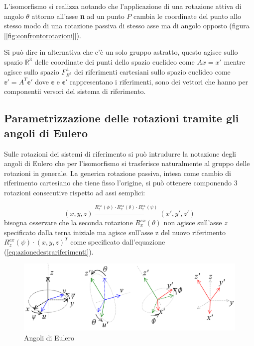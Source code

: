 \documentclass[11pt]{report}
\theoremstyle{plain}
\theoremstyle{definition}
\theoremstyle{remark}
\begin{document}
L'isomorfismo si realizza notando che l'applicazione di una rotazione attiva di angolo $\theta$ attorno all'asse \textbf{n} ad un punto $P$ cambia le coordinate del punto allo stesso modo di una rotazione passiva di stesso asse ma di angolo opposto (figura [\ref{fig:confrontorotazioni}]).

Si può dire in alternativa che c'è un solo gruppo astratto, questo agisce sullo spazio $\mathbb{R}^{3}$ delle coordinate dei punti dello spazio euclideo come $A x = x'$ mentre agisce sullo spazio $F_{E^{3}}^{\bot}$ dei riferimenti cartesiani sullo spazio euclideo come $ \mathbb{e'} = A^{T}\mathbb{e'} $ dove $\mathbb{e}$ e $\mathbb{e}'$ rappresentano i riferimenti, sono dei vettori che hanno per componentii versori del sistema di riferimento.

\subsection{Parametrizzazione delle rotazioni tramite gli angoli di Eulero}
Sulle rotazioni dei sistemi di riferimento si può intrudurre la notazione degli angoli di Eulero che per l'isomorfismo si trasferisce naturalmente al gruppo delle rotazioni in generale.
La generica rotazione passiva, intesa come cambio di riferimento cartesiano che tiene fisso l'origine, si può ottenere componendo 3 rotazioni consecutive rispetto ad assi semplici:

\begin{equation}
(x,y,z)\xrightarrow{R^{ex}_{z}(\phi) \cdot R^{ex}_{x}(\theta)\cdot R^{ex}_{z}(\psi)} (x',y',z')
\end{equation}
bisogna osservare che la seconda rotazione $R^{ex}_{x}(\theta)$ non agisce sull'asse $z$ specificato dalla terna iniziale ma agisce sull'asse z del nuovo riferimento $R^{ex}_{z}(\psi) \cdot (x,y,z)^{T} $ come specificato dall'equazione (\ref{eq:azionedestrariferimenti}).


\begin{figure}[!h]\label{fig:euler}
\includegraphics[width=15cm,keepaspectratio]{immagini/Capitolo_III/EulerG}			
			\caption{Angoli di Eulero}
\end{figure}
\end{document}
